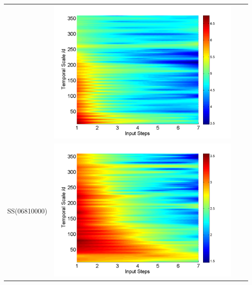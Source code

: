 \documentclass[draft,wrr]{AGUTeX}
\begin{document}
\begin{article}
\begin{table}[H]
\begin{tabular}{cccc}
&\begin{minipage}{.3\textwidth}\includegraphics[width=\linewidth]{resultgraph/11532500pepq_rela.png}\end{minipage}
\\
SS(06810000)
&\begin{minipage}{.3\textwidth}\includegraphics[width=\linewidth]{resultgraph/06810000p_rela.png}\end{minipage}

\end{tabular}
\end{table}
\end{article}
\end{document}
